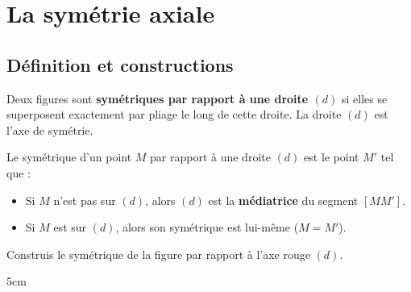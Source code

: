 \documentclass[a4paper]{book}
\begin{document}
\setcounter{chapter}{13} 
\renewcommand{\monTitre}{La symétrie axiale}
\chapter{\monTitre}
\thispagestyle{fancy}


\section{Définition et constructions}

    \begin{definition}
        Deux figures sont \textbf{symétriques par rapport à une droite $(d)$} si elles se superposent exactement par pliage le long de cette droite. La droite $(d)$ est l'axe de symétrie.
    \end{definition}
    
    
    \begin{definition}
        Le symétrique d'un point $M$ par rapport à une droite $(d)$ est le point $M'$ tel que :
        \begin{itemize}
            \item Si $M$ n'est pas sur $(d)$, alors $(d)$ est la \textbf{médiatrice} du segment $[MM']$.
            \item Si $M$ est sur $(d)$, alors son symétrique est lui-même ($M = M'$).
        \end{itemize}
    \end{definition}
    
    
    \begin{center}
    \end{center}
    
    
    \begin{exemple}
        Construis le symétrique de la figure par rapport à l'axe rouge $(d)$.
        \begin{ZoneReponse}{5cm}
        \begin{center}
        \end{center}
        \end{ZoneReponse}
    \end{exemple}
    
\end{document}
